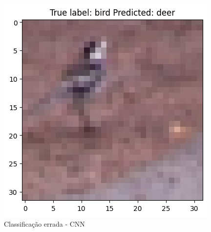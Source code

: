 \begin{figure}[H]
\centering
\includegraphics[width=.8\linewidth]{apendices/fig/9_IAA009_4.png}
\caption{Classificação errada - CNN}
\end{figure}


